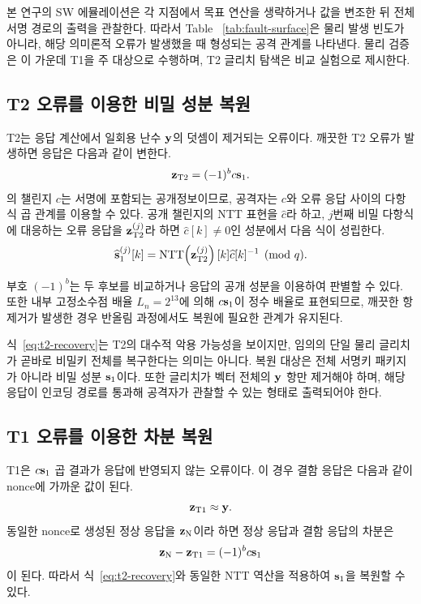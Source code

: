 본 연구의 SW 에뮬레이션은 각 지점에서 목표 연산을 생략하거나 값을
변조한 뒤 전체 서명 경로의 출력을 관찰한다. 따라서 Table
~\ref{tab:fault-surface}은 물리 발생 빈도가 아니라, 해당 의미론적
오류가 발생했을 때 형성되는 공격 관계를 나타낸다. 물리 검증은 이
가운데 T1을 주 대상으로 수행하며, T2 글리치 탐색은 비교 실험으로
제시한다.

\subsection{T2 오류를 이용한 비밀 성분 복원}
\label{subsec:t2-analysis}

T2는 응답 계산에서 일회용 난수 $\mathbf{y}$의 덧셈이 제거되는 오류이다.
깨끗한 T2 오류가 발생하면 응답은 다음과 같이 변한다.
\begin{equation}
  \mathbf{z}_{\mathrm{T2}}=(-1)^b c\mathbf{s}_1 .
  \label{eq:t2-response}
\end{equation}
의 챌린지 $c$는 서명에 포함되는 공개정보이므로, 공격자는
$c$와 오류 응답 사이의 다항식 곱 관계를 이용할 수 있다. 공개
챌린지의 NTT 표현을 $\widehat{c}$라 하고, $j$번째 비밀 다항식에
대응하는 오류 응답을 $\mathbf{z}_{\mathrm{T2}}^{(j)}$라 하면
$\widehat{c}[k]\neq0$인 성분에서 다음 식이 성립한다.
\begin{equation}
 \widehat{\mathbf{s}}_1^{(j)}[k]
 =
 \operatorname{NTT}\!\left(
 \mathbf{z}_{\mathrm{T2}}^{(j)}\right)[k]
 \widehat{c}[k]^{-1}\pmod q .
 \label{eq:t2-recovery}
\end{equation}

부호 $(-1)^b$는 두 후보를 비교하거나 응답의 공개 성분을 이용하여
판별할 수 있다. 또한 내부 고정소수점 배율 $L_n=2^{13}$에 의해
$c\mathbf{s}_1$이 정수 배율로 표현되므로, 깨끗한 항 제거가 발생한 경우
반올림 과정에서도 복원에 필요한 관계가 유지된다.

식~\eqref{eq:t2-recovery}는 T2의 대수적 악용 가능성을 보이지만,
임의의 단일 물리 글리치가 곧바로 비밀키 전체를 복구한다는 의미는
아니다. 복원 대상은 전체 서명키 패키지가 아니라 비밀 성분
$\mathbf{s}_1$이다. 또한 글리치가 벡터 전체의 $\mathbf{y}$ 항만 제거해야 하며,
해당 응답이 인코딩 경로를 통과해 공격자가 관찰할 수 있는 형태로
출력되어야 한다.

\subsection{T1 오류를 이용한 차분 복원}
\label{subsec:t1-analysis}

T1은 $c\mathbf{s}_1$ 곱 결과가 응답에 반영되지 않는 오류이다. 이 경우
결함 응답은 다음과 같이 nonce에 가까운 값이 된다.
\begin{equation}
  \mathbf{z}_{\mathrm{T1}}\approx\mathbf{y} .
  \label{eq:t1-response}
\end{equation}
동일한 nonce로 생성된 정상 응답을 $\mathbf{z}_{\mathrm{N}}$이라 하면 정상
응답과 결함 응답의 차분은
\begin{equation}
  \mathbf{z}_{\mathrm{N}}-\mathbf{z}_{\mathrm{T1}}
  =(-1)^b c\mathbf{s}_1
  \label{eq:t1-difference}
\end{equation}
이 된다. 따라서 식~\eqref{eq:t2-recovery}와 동일한 NTT 역산을
적용하여 $\mathbf{s}_1$을 복원할 수 있다.

